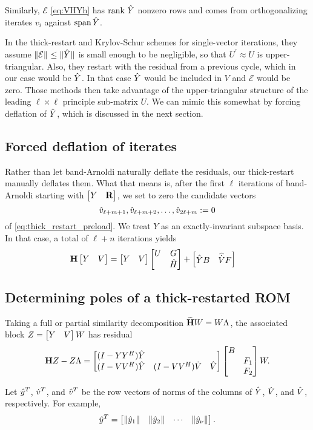 Similarly, $\mathcal{E}$ \eqref{eq:VHYh} has $\text{rank } \hat{Y}$ nonzero rows and comes from orthogonalizing iterates $v_i$ against $\operatorname*{span} \hat{Y}$.   

 In the thick-restart \cite{dynamicthick} and Krylov-Schur  \cite{stewart2002krylov} schemes for single-vector iterations, they assume $\left\| \mathcal{E} \right\|_{}\leq\|\hat{Y} \|$ is small enough to be negligible, so that $U^\prime\approx U$ is upper-triangular.  Also, they restart with the residual from a previous cycle, which in our case would be $\hat{Y}$.  In that case $\hat{Y}$ would be included in $V$ and $\mathcal{E}$ would be zero.  Those methods then take advantage of the upper-triangular structure of the leading $\ell\times\ell$ principle sub-matrix $U$.  We can mimic this somewhat by forcing deflation of $\hat{Y}$, which is discussed in the next section.


\subsection{Forced deflation of iterates}\label{sec:manual_deflation}
Rather than let band-Arnoldi naturally deflate the residuals, our thick-restart manually deflates them.  What that means is, after the first $\ell$ iterations of band-Arnoldi starting with $\begin{bmatrix} Y&\textbf{\textup{R}}\end{bmatrix}$, we set to zero the candidate vectors 
\[ 
 \hat{v}_{\ell+m+1}, \hat{v}_{\ell+m+2},\ldots, \hat{v}_{2\ell+m} := 0
\]
 of \eqref{eq:thick_restart_preload}.  We treat $Y$ as an exactly-invariant subspace basis. In that case, a total of $\ell+ n$ iterations yields 
\begin{align}
\textbf{\textup{H}} \begin{bmatrix} Y&V\end{bmatrix} &= \begin{bmatrix} Y&V\end{bmatrix} \begin{bmatrix} U & G \\ &\hat{H}\end{bmatrix} 
+\begin{bmatrix}  \hat{Y} B & \widehat{\dot{V}} F \end{bmatrix} 
\label{eq:thick_barnoldi_relation} 
\end{align}


\subsection{Determining poles of a thick-restarted ROM}
Taking a full or partial similarity decomposition $\widetilde{\textbf{\textup{H}}} W = W \Lambda$, the associated block $Z= \begin{bmatrix} Y&V\end{bmatrix}W$ has residual
\[
\textbf{\textup{H}} Z - Z \Lambda = \begin{bmatrix} (I-YY^H)\hat{Y} & & \\
		(I-VV^H)\hat{Y} &(I-VV^H)\dot{V} & \hat{V} \end{bmatrix} \begin{bmatrix} B&\\&F_1\\&F_2\end{bmatrix} W.
\]

Let $\hat{y}^T$, $\dot{v}^T$,  and $\hat{v}^T$ be the row vectors of norms of the columns of $\hat{Y}$, $\dot{V}$, and $\hat{V}$, respectively.  For example, 
\[
\hat{y}^T = \begin{bmatrix} \| \hat{y}_1 \| &\| \hat{y}_2 \| &\cdots&\| \hat{y}_\nu \|\end{bmatrix} . 
\]

